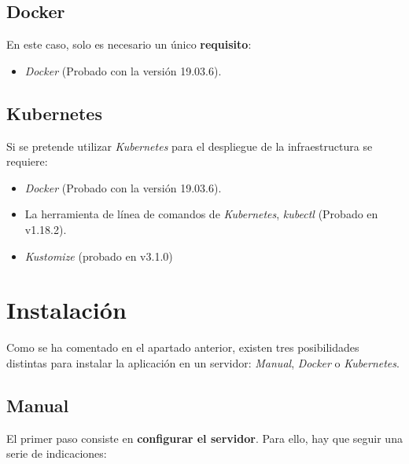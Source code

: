 \subsection{Docker}

En este caso, solo es necesario un único \textbf{requisito}:
\begin{itemize}
\tightlist
\item
  \emph{Docker} \cite{docker:install} (Probado con la versión 19.03.6).
\end{itemize}

\subsection{Kubernetes}

Si se pretende utilizar \emph{Kubernetes} para el despliegue de la
infraestructura se requiere:
\begin{itemize}
\tightlist
\item
  \emph{Docker}  \cite{docker:install} (Probado con la versión 19.03.6).
\item
  La herramienta de línea de comandos de \emph{Kubernetes},
  \emph{kubectl} \cite{kubectl:install} (Probado en v1.18.2).
\item
  \emph{Kustomize} \cite{kustomize:repo} (probado en v3.1.0)
\end{itemize}

\section{Instalación}

Como se ha comentado en el apartado anterior, existen tres posibilidades
distintas para instalar la aplicación en un servidor: \emph{Manual},
\emph{Docker} o \emph{Kubernetes}.

\subsection{Manual}
El primer paso consiste en \textbf{configurar el servidor}. Para ello,
hay que seguir una serie de indicaciones:

